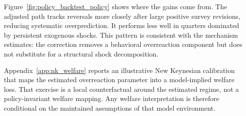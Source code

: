 Figure~\ref{fig:policy_backtest_policy} shows where the gains come from. The
adjusted path tracks reversals more closely after large positive survey
revisions, reducing systematic overprediction. It performs less well in
quarters dominated by persistent exogenous shocks. This pattern is
consistent with the mechanism estimates: the correction removes a
behavioral overreaction component but does not substitute for a
structural shock decomposition.



\medskip

Appendix~\ref{app:nk_welfare} reports an illustrative New Keynesian
calibration that maps the estimated overreaction parameter into a
model-implied welfare loss. That exercise is a local counterfactual
around the estimated regime, not a policy-invariant welfare mapping.
Any welfare interpretation is therefore conditional on the maintained
assumptions of that model environment.


